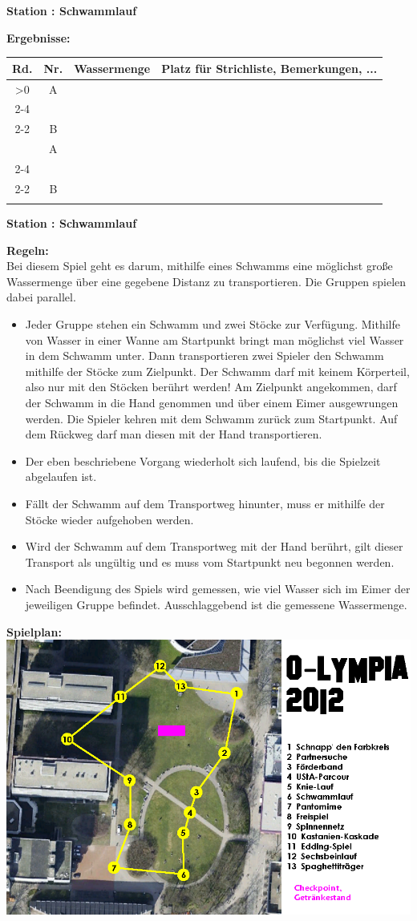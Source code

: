 \documentclass{scrartcl}
\newcommand{\replicate}[2]{\ifnum#1>0 #2
	\expandafter\replicate\expandafter{\number\numexpr#1-1}{#2}\fi}
\newcommand{\modulo}[2]{#1-((#1+#2)/#2-1)*#2}
\newcounter{station}\setcounter{station}{1}
\newcounter{ctrA}
\newcounter{ctrB}
\newcounter{currentRow}
\newcounter{noOfStations}\setcounter{noOfStations}{13}
\newenvironment{stationsheet}[3]
{\begin{center} \textbf{\huge Station \arabic{station}: #1}\\[2em]\end{center}
\textbf{\Large Ergebnisse:}\\[1em]
\setcounter{ctrA}{\value{station}}
\setcounter{ctrB}{\value{station}}
\setcounter{currentRow}{1}
\begin{tabular}{|c|c|p{3cm}|p{11cm}|}
\hline
\textbf{Rd.} & \textbf{Nr.} & \textbf{#2} & \textbf{Platz für Strichliste, Bemerkungen, ...}\\ \hline
\replicate{\value{noOfStations}}
{
\multirow{2}{*}{\arabic{currentRow}} & A\arabic{ctrA} & &
\ifthenelse{#3=0}{\\ \cline{2-4}}{\\ \cline{2-2}}
 & B\arabic{ctrB} & & \stepcounter{currentRow}
\setcounter{ctrA}{1+\modulo{\value{ctrA}-2}{\value{noOfStations}}}
\setcounter{ctrB}{1+\modulo{\value{ctrB}}{\value{noOfStations}}}
\\ \hline
}
\end{tabular}
\clearpage
\begin{center}\textbf{\huge Station \arabic{station}: #1}\\[1em]\end{center}
\textbf{\Large Regeln:}\\[1em]
}
{
\textbf{\Large Spielplan:}\\[1em]
\includegraphics[scale=0.53]{spielplan_klein.png}
\addtocounter{station}{1}
\clearpage
}
\begin{document}
\begin{stationsheet}{Schwammlauf}{Wassermenge}{0}
Bei diesem Spiel geht es darum, mithilfe eines Schwamms eine möglichst große Wassermenge über eine gegebene Distanz zu transportieren. Die Gruppen spielen dabei parallel.
\begin{itemize}
\item Jeder Gruppe stehen ein Schwamm und zwei Stöcke zur Verfügung. Mithilfe von Wasser in einer Wanne am Startpunkt bringt man möglichst viel Wasser in dem Schwamm unter. Dann transportieren zwei Spieler den Schwamm mithilfe der Stöcke zum Zielpunkt. Der Schwamm darf mit keinem Körperteil, also nur mit den Stöcken berührt werden! Am Zielpunkt angekommen, darf der Schwamm in die Hand genommen und über einem Eimer ausgewrungen werden. Die Spieler kehren mit dem Schwamm zurück zum Startpunkt. Auf dem Rückweg darf man diesen mit der Hand transportieren.
\item Der eben beschriebene Vorgang wiederholt sich laufend, bis die Spielzeit abgelaufen ist.
\item Fällt der Schwamm auf dem Transportweg hinunter, muss er mithilfe der Stöcke wieder aufgehoben werden.
\item Wird der Schwamm auf dem Transportweg mit der Hand berührt, gilt dieser Transport als ungültig und es muss vom Startpunkt neu begonnen werden.
\item Nach Beendigung des Spiels wird gemessen, wie viel Wasser sich im Eimer der jeweiligen Gruppe befindet. Ausschlaggebend ist die gemessene Wassermenge.
\end{itemize}
\end{stationsheet}
\end{document}
